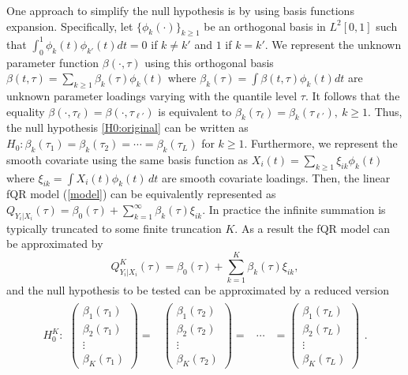 \documentclass[times,sort&compress,3p]{elsarticle}
\theoremstyle{plain}%
\theoremstyle{definition}
\begin{document}
One approach to simplify the null hypothesis is by using basis functions expansion. Specifically, let $\{ \phi_k(\cdot) \}_{k\geq 1}$ be an orthogonal basis in $L^2[0,1]$ such that $\int_0^1 \phi_k(t) \phi_{k'}(t) dt =0$ if $k\neq k'$ and $1$ if $k=k'$. We represent the unknown parameter function $\beta(\cdot, \tau)$ using this orthogonal basis $\beta(t, \tau) = \sum_{k \geq 1}
 \beta_k(\tau) \phi_k(t)$ where $\beta_k(\tau) = \int \beta(t, \tau)  \phi_k(t) dt $ are unknown parameter loadings varying with the quantile level $\tau$. It follows that the equality $\beta(\cdot, \tau_{\ell}) = \beta(\cdot, \tau_{\ell'})$ is equivalent to 
 $\beta_k(\tau_{\ell}) = \beta_{k} (\tau_{\ell'}),~k \geq 1$. Thus, the null hypothesis \eqref{H0:original} can be written as $H_0: \beta_k(\tau_1) = \beta_k(\tau_2) = \cdots = \beta_k(\tau_L)$ for $k \geq 1$. Furthermore, we represent the smooth covariate using the same basis function as $X_i(t) = \sum_{k \geq 1} \xi_{ ik} \phi_k(t)$ where $\xi_{ ik}  =\int X_i(t) \phi_k(t) \, dt$ are smooth covariate loadings. Then, the linear fQR model (\ref{model}) can be equivalently represented as $
Q_{Y_i|X_i}(\tau) = \beta_0(\tau) + \sum_{k = 1}^{\infty}\beta_k(\tau)\xi_{ik}$. In practice the infinite summation is typically truncated to some finite truncation $K$. As a result the fQR model can be approximated by 
\begin{equation}\label{model_finite} 
Q^K_{Y_i|X_i}(\tau) = \beta_0(\tau) + \sum_{k = 1}^{K}\beta_k(\tau)\xi_{ik},
\end{equation} 
and the null hypothesis to be tested can be approximated by a reduced version 
\begin{eqnarray}
\label{H0:finite} 
H_0^K: \begin{array}{cccc}
\begin{pmatrix} \beta_1(\tau_1)\\ \beta_2(\tau_1)\\ \vdots \\
\beta_{K}(\tau_{1})
\end{pmatrix} = &
\begin{pmatrix} \beta_1(\tau_2)\\ \beta_2{(\tau_2)}\\ \vdots \\
\beta_{K}(\tau_{2})
\end{pmatrix} = & \cdots & =
\begin{pmatrix} \beta_1(\tau_L)\\ \beta_2{(\tau_L)}\\ \vdots\\
\beta_{K}(\tau_L)
\end{pmatrix}
\end{array}.
\end{eqnarray}
\end{document}
